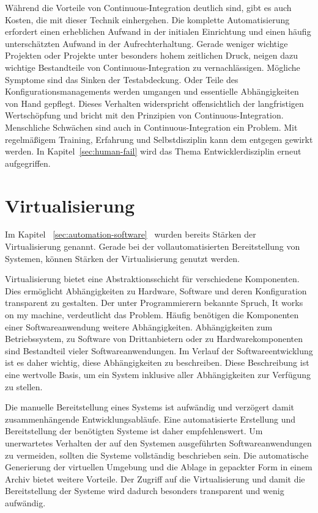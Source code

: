 Während die Vorteile von Continuous-Integration deutlich sind, gibt es auch Kosten, die mit dieser Technik einhergehen. Die komplette Automatisierung erfordert einen erheblichen Aufwand in der initialen Einrichtung und einen häufig unterschätzten Aufwand in der Aufrechterhaltung. 
Gerade weniger wichtige Projekten oder Projekte unter besonders hohem zeitlichen Druck, neigen dazu wichtige Bestandteile von Continuous-Integration zu vernachlässigen. Mögliche Symptome sind das Sinken der Testabdeckung. Oder Teile des Konfigurationsmanagements werden umgangen und essentielle Abhängigkeiten von Hand gepflegt. Dieses Verhalten widerspricht offensichtlich der langfristigen Wertschöpfung und bricht mit den Prinzipien von Continuous-Integration. Menschliche Schwächen sind auch in Continuous-Integration ein Problem. Mit regelmäßigem 
Training, Erfahrung und Selbstdisziplin kann dem entgegen gewirkt werden. In Kapitel~\ref{sec:human-fail} \glqq {}\grqq{} wird das Thema Entwicklerdisziplin erneut aufgegriffen.

\section{Virtualisierung}

Im Kapitel ~\ref{sec:automation-software}~ wurden bereits Stärken der Virtualisierung genannt. Gerade bei der vollautomatisierten Bereitstellung von Systemen, können Stärken der Virtualisierung genutzt werden.

Virtualisierung bietet eine Abstraktionsschicht für verschiedene Komponenten. Dies ermöglicht Abhängigkeiten zu Hardware, Software und deren Konfiguration transparent zu gestalten. Der unter Programmierern bekannte Spruch, \glqq It works on my machine\grqq{}, verdeutlicht das Problem. Häufig benötigen die Komponenten einer Softwareanwendung weitere Abhängigkeiten. Abhängigkeiten zum Betriebssystem, zu Software von Drittanbietern oder zu Hardwarekomponenten sind Bestandteil
vieler Softwareanwendungen. Im Verlauf der Softwareentwicklung ist es daher wichtig, diese Abhängigkeiten zu beschreiben. Diese Beschreibung ist eine wertvolle Basis, um ein System inklusive aller Abhängigkeiten zur Verfügung zu stellen.

Die manuelle Bereitstellung eines Systems ist aufwändig und verzögert damit zusammenhängende Entwicklungsabläufe. Eine automatisierte Erstellung und Bereitstellung der benötigten Systeme ist daher empfehlenswert. Um unerwartetes Verhalten 
der auf den Systemen ausgeführten Softwareanwendungen zu vermeiden, sollten die Systeme vollständig beschrieben sein. Die automatische Generierung der virtuellen Umgebung und die Ablage in gepackter Form in einem Archiv bietet weitere Vorteile. Der Zugriff auf die Virtualisierung und damit die Bereitstellung der Systeme wird dadurch besonders transparent 
und wenig aufwändig.


